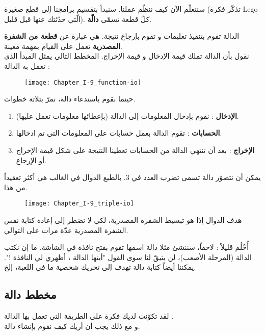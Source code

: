 سنتعلّم الآن كيف ننظّم عملنا. سنبدأ بتقسيم برامجنا إلى قطع صغيرة (تذكّر فكرة
\textenglish{Lego}
الّتي حدّثتك عنها قبل قليل). كلّ قطعة تسمّى
\textbf{دالّة}.

الدالة تقوم بتنفيذ تعليمات و تقوم بإرجاع نتيجة. هي عبارة عن 
\textbf{قطعة من الشفرة المصدرية} 
تعمل على القيام بمهمة معينة.\\
نقول بأن الدالة تملك قيمة الإدخال و قيمة الإخراج. المخطط التالي يمثل المبدأ الذي تعمل به الدالة :

\begin{figure}[H]
	\centering
	\texttt{[image: Chapter\_I-9\_function-io]}
\end{figure}

حينما نقوم باستدعاء دالة، نمرّ بثلاثة خطوات.

\begin{enumerate}
	\item \textbf{الإدخال}
	: نقوم بإدخال المعلومات إلى الدالة (بإعطائها معلومات تعمل عليها).
	\item \textbf{الحسابات}
	: تقوم الدالة بعمل حسابات على المعلومات التي تم ادخالها.
	\item \textbf{الإخراج}
	: بعد أن تنتهي الدالة من الحسابات تعطينا النتيجة على شكل قيمة الإخراج أو الإرجاع.
\end{enumerate}

يمكن أن نتصوّر دالة تسمى
تضرب العدد في 3. بالطبع الدوال في الغالب هي أكثر تعقيداً من هذا.

\begin{figure}[H]
	\centering
	\texttt{[image: Chapter\_I-9\_triple-io]}
\end{figure}

هدف الدوال إذا هو تبسيط الشفرة المصدرية، لكي لا نضطر إلى إعادة كتابة نفس الشفرة المصدرية عدّة مرات على التوالي.

أُحْلُم قليلاً : لاحقاً، سننشئ مثلا دالة اسمها
تقوم بفتح نافذة في الشاشة. ما إن نكتب الدالة (المرحلة الأصعب)، لن يتبقّ لنا سوى القول "أيتها الدالة
،
أظهري لي النافذة !". يمكننا أيضاً كتابة دالة
تهدف إلى تحريك شخصية ما في اللعبة، إلخ.

\subsection{مخطط دالة}

لقد تكوّنت لديك فكرة على الطريقة التي تعمل بها الدالة 
.\\
و مع ذلك يجب أن أريك كيف نقوم بإنشاء دالة. 

